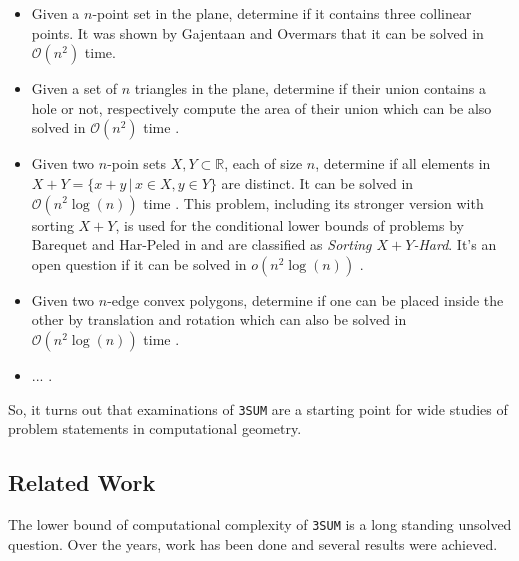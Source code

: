 \begin{itemize}
    \item Given a $n$-point set in the plane, determine if it contains three collinear points. It was shown by Gajentaan and Overmars \cite{gajentaan1995class} that it can be solved in $\mathcal{O}\left(n^{2}\right)$ time.
    \item Given a set of $n$ triangles in the plane, determine if their union contains a hole or not, respectively compute the area of their union which can be also solved in $\mathcal{O}\left(n^{2}\right)$ time \cite{gajentaan1995class}.
    \item Given two $n$-poin sets $X, Y \subset \mathbb{R}$, each of size $n$, determine if all elements in $X + Y = \{x + y \, | \, x \in X, y \in Y\}$ are distinct. It can be solved in $\mathcal{O}\left(n^{2}\log\left(n\right)\right)$ time \cite{barequet2001polygon}. This problem, including its stronger version with sorting $X + Y$, is used for the conditional lower bounds of problems by Barequet and Har-Peled in \cite{barequet2001polygon} and are classified as \textit{Sorting $X + Y$-Hard}. It's an open question if it can be solved in $o\left(n^{2}\log\left(n\right)\right)$ \cite{TheOpenP60:online} \cite{TheOpenP60:onlineP11} \cite{TheOpenP60:onlineP41}.    
    \item Given two $n$-edge convex polygons, determine if one can be placed inside the other by translation and rotation which can also be solved in $\mathcal{O}\left(n^{2}\log\left(n\right)\right)$ time \cite{barequet2001polygon}.
    \item ... .
\label{it:3sumhardnessproblems}
\end{itemize}

So, it turns out that examinations of \texttt{3SUM} are a starting point for wide studies of problem statements in computational geometry.
\subsection{Related Work}
\label{ss:relatedwork}
The lower bound of computational complexity of \texttt{3SUM} is a long standing unsolved question. Over the years, work has been done and several results were achieved.


